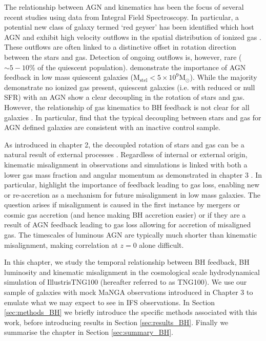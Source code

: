 The relationship between AGN and kinematics has been the focus of several recent studies using data from Integral Field Spectroscopy. In particular, a potential new class of galaxy termed `red geyser' has been identified which host AGN and exhibit high velocity outflows in the spatial distribution of ionized gas \citep[][]{cheung2016, roy2018}. These outflows are often linked to a distinctive offset in rotation direction between the stars and gas. Detection of ongoing outflows is, however, rare ($\sim5-10$\% of the quiescent population). \citet{penny2018} demonstrate the importance of AGN feedback in low mass quiescent galaxies ($\mathrm{M_{stel} < 5 \times 10^{9}M_{\odot}}$). While the majority demonstrate no ionized gas present, quiescent galaxies (i.e. with reduced or null SFR) with an AGN show a clear decoupling in the rotation of stars and gas. However, the relationship of gas kinematics to BH feedback is not clear for all galaxies \citep[see also:][]{koudmani2019}. In particular, \citet{ilha2019} find that the typical decoupling between stars and gas for AGN defined galaxies are consistent with an inactive control sample. 

As introduced in chapter 2, the decoupled rotation of stars and gas can be a natural result of external processes \cite[e.g.][]{davis2011, barrera2015, vdvoort2015, jin2016, bryant2019, duckworth2019_halo, li_decoupling2019}. Regardless of internal or external origin, kinematic misalignment in observations and simulations is linked with both a lower gas mass fraction and angular momentum as demonstrated in chapter 3 \citep[see also;][]{starkenburg+19, khim2019}. In particular, \citet{starkenburg+19} highlight the importance of feedback leading to gas loss, enabling new or re-accretion as a mechanism for future misalignment in low mass galaxies. The question arises if misalignment is caused in the first instance by mergers or cosmic gas accretion (and hence making BH accretion easier) or if they are a result of AGN feedback leading to gas loss allowing for accretion of misaligned gas. The timescales of luminous AGN are typically much shorter than kinematic misalignment, making correlation at $z=0$ alone difficult. 


In this chapter, we study the temporal relationship between BH feedback, BH luminosity and kinematic misalignment in the cosmological scale hydrodynamical simulation of IllustrisTNG100 (hereafter referred to as TNG100). We use our sample of galaxies with mock MaNGA observations introduced in Chapter 3 to emulate what we may expect to see in IFS observations. In Section \ref{sec:methods_BH} we briefly introduce the specific methods associated with this work, before introducing results in Section \ref{sec:results_BH}. Finally we summarise the chapter in Section \ref{sec:summary_BH}.

